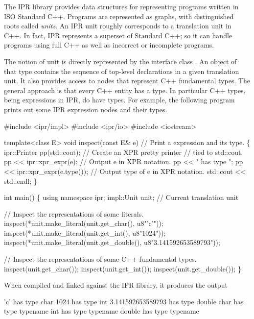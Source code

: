 \documentclass[11pt]{article}
\begin{document}
The IPR library provides data structures for representing programs written in
ISO Standard C++.  Programs are represented as graphs, with distinguished
roots called \emph{units}.  An IPR unit roughly corresponds to a translation
unit in C++.  In fact, IPR represents a superset of Standard C++; so it can
handle programs using full C++  as well as incorrect or incomplete programs. 

The notion of unit is directly represented by the interface class
. An object of that type contains the sequence of top-level
declarations in a given translation unit. It also provides  access to nodes
that represent C++ fundamental types.  The general approach is that
every C++ entity has a type.  In particular C++ types, being expressions in
IPR, do have types.  For example, the following program prints out some
IPR expression nodes and their types.
\begin{Program}
#include <ipr/impl>
#include <ipr/io>
#include <iostream>

template<class E>
void inspect(const E& e)        // Print a expression and its type.
\{
   ipr::Printer pp(std::cout);  // Create an XPR pretty printer
                                // tied to std::cout.
   pp << ipr::xpr_expr(e);      // Output e in XPR notation.
   pp << " has type ";
   pp << ipr::xpr_expr(e.type()); // Output type of e in XPR notation.
   std::cout << std::endl;
\}

int main()
\{
   using namespace ipr;
   impl::Unit unit;             // Current translation unit

   // Inspect the representations of some literals.
   inspect(*unit.make_literal(unit.get_char(), u8"'c'"));
   inspect(*unit.make_literal(unit.get_int(), u8"1024"));
   inspect(*unit.make_literal(unit.get_double(), u8"3.141592653589793"));

   // Inspect the representations of some C++ fundamental types.
   inspect(unit.get_char());
   inspect(unit.get_int());
   inspect(unit.get_double());
\}
\end{Program}

When compiled and linked against the IPR library, it produces the output
\begin{Output}
'c' has type char
1024 has type int
3.141592653589793 has type double
char has type  typename
int has type  typename
double has type  typename
\end{Output}

\end{document}

